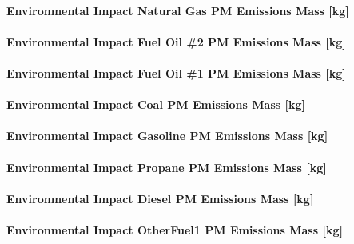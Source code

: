 \paragraph{Environmental Impact Natural Gas PM Emissions Mass {[}kg{]}}\label{environmental-impact-natural-gas-pm-emissions-mass-kg}

\paragraph{Environmental Impact Fuel Oil \#2 PM Emissions Mass {[}kg{]}}\label{environmental-impact-fuel-oil-2-pm-emissions-mass-kg}

\paragraph{Environmental Impact Fuel Oil \#1 PM Emissions Mass {[}kg{]}}\label{environmental-impact-fuel-oil-1-pm-emissions-mass-kg}

\paragraph{Environmental Impact Coal PM Emissions Mass {[}kg{]}}\label{environmental-impact-coal-pm-emissions-mass-kg}

\paragraph{Environmental Impact Gasoline PM Emissions Mass {[}kg{]}}\label{environmental-impact-gasoline-pm-emissions-mass-kg}

\paragraph{Environmental Impact Propane PM Emissions Mass {[}kg{]}}\label{environmental-impact-propane-pm-emissions-mass-kg}

\paragraph{Environmental Impact Diesel PM Emissions Mass {[}kg{]}}\label{environmental-impact-diesel-pm-emissions-mass-kg}

\paragraph{Environmental Impact OtherFuel1 PM Emissions Mass {[}kg{]}}\label{environmental-impact-otherfuel1-pm-emissions-mass-kg}

